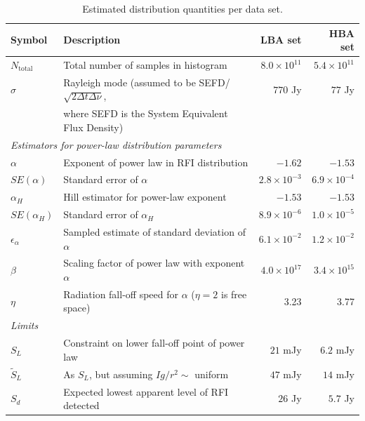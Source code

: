 \documentclass[useAMS,usenatbib]{mn2e}
\begin{document}
\begin{table}
\centering
\begin{minipage}{12cm}
\caption{Estimated distribution quantities per data set. }\label{table:dist-data-quantities}
\begin{tabular}{@{}llrr@{}}
\textbf{Symbol} & \textbf{Description} & \textbf{LBA set}& \textbf{HBA set} \\
\hline
\hline
$N_\textrm{total}$ & Total number of samples in histogram & $8.0\times10^{11}$ & $5.4\times10^{11}$ \\
$\sigma$ & Rayleigh mode (assumed to be SEFD/$\sqrt{2\Delta t \Delta \nu}$, & $770$ Jy & $77$ Jy \\
 & where SEFD is the System Equivalent Flux Density) & & \\
\hline
\multicolumn{4}{l}{\textit{Estimators for power-law distribution parameters}} \\
\hline
$\alpha$ & Exponent of power law in RFI distribution      & $-1.62$ & $-1.53$ \\ %
$SE(\alpha)$ & Standard error of $\alpha$ & $2.8 \times 10^{-3}$ & $6.9 \times 10^{-4}$ \\
$\alpha_H$ & Hill estimator for power-law exponent & $-1.53$ & $-1.53$ \\
$SE(\alpha_H)$ & Standard error of $\alpha_H$ & $8.9 \times 10^{-6}$ & $1.0\times10^{-5}$ \\
$\epsilon_{\alpha}$ & Sampled estimate of standard deviation of $\alpha$ & $6.1 \times 10^{-2}$ & $1.2 \times 10^{-2}$ \\
$\beta$ & Scaling factor of power law with exponent $\alpha$ & $4.0 \times 10^{17}$ & $3.4\times 10^{15}$ \\
$\eta$ & Radiation fall-off speed for $\alpha$ ($\eta=2$ is free space) & 3.23 & 3.77 \\
\hline
\multicolumn{4}{l}{\textit{Limits}} \\
\hline
$S_L$ & Constraint on lower fall-off point of power law & $21$ mJy & $6.2$ mJy \\ %
$\tilde{S}_L$ & As $S_L$, but assuming $Ig/r^2\sim$ uniform & $47$ mJy & $14$ mJy \\ %
$S_d$ & Expected lowest apparent level of RFI detected & $26$ Jy & $5.7$ Jy\\ %

\end{tabular}
\end{minipage}
\end{table}
\end{document}
